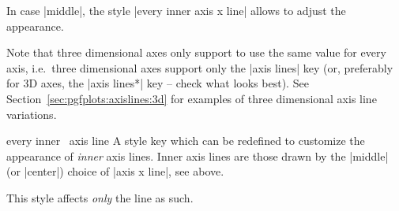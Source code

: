 \begin{pgfplotskeylist}
\begin{codeexample}[]
\end{codeexample}

\begin{codeexample}[]
\end{codeexample}

\begin{codeexample}[]
\end{codeexample}

In case |middle|, the style |every inner axis x line| allows to adjust the appearance.

Note that three dimensional axes only support to use the same value for every axis, i.e.\ three dimensional axes support only the |axis lines| key (or, preferably for 3D axes, the |axis lines*| key -- check what looks best). See Section~\ref{sec:pgfplots:axislines:3d} for examples of three dimensional axis line variations.
\end{pgfplotskeylist}

\begin{pgfplotsxykey}{every inner \x\ axis line}
	A style key which can be redefined to customize the appearance of \emph{inner} axis lines. Inner axis lines are those drawn by the |middle| (or |center|) choice of |axis x line|, see above.

	This style affects \emph{only} the line as such.
\begin{codeexample}[]
\end{codeexample}
\end{pgfplotsxykey}

